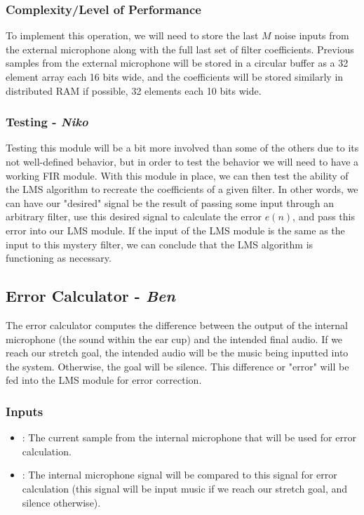 \documentclass{fpgairpods}
\begin{document}
\begin{multicols*}{2}
\subsubsection{Complexity/Level of Performance}
To implement this operation, we will need to store the last $M$ noise inputs from the external microphone along with the full last set of filter coefficients. Previous samples from the external microphone will be stored in a circular buffer as a 32 element array each 16 bits wide, and the coefficients will be stored similarly in distributed RAM if possible, 32 elements each 10 bits wide.

\subsubsection{Testing - \textit{Niko}}
Testing this module will be a bit more involved than some of the others due to its not well-defined behavior, but in order to test the behavior we will need to have a working FIR module. With this module in place, we can then test the ability of the LMS algorithm to recreate the coefficients of a given filter. In other words, we can have our "desired" signal be the result of passing some input through an arbitrary filter, use this desired signal to calculate the error $e(n)$, and pass this error into our LMS module. If the input of the LMS module is the same as the input to this mystery filter, we can conclude that the LMS algorithm is functioning as necessary.

\subsection{Error Calculator - \textit{Ben}}
The error calculator computes the difference between the output of the internal microphone (the sound within the ear cup) and the intended final audio. If we reach our stretch goal, the intended audio will be the music being inputted into the system. Otherwise, the goal will be silence. This difference or "error" will be fed into the LMS module for error correction.
\subsubsection{Inputs}
\begin{itemize}
    \item {}: The current sample from the internal microphone that will be used for error calculation.
    \item {}: The internal microphone signal will be compared to this signal for error calculation (this signal will be input music if we reach our stretch goal, and silence otherwise).
\end{itemize}

\end{multicols*}
\end{document}
